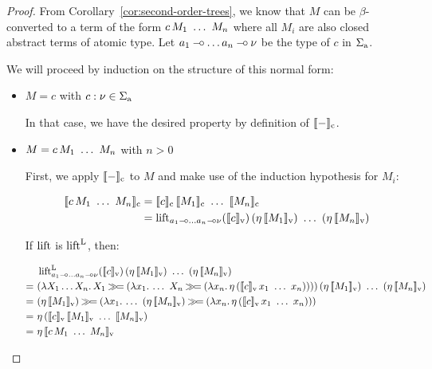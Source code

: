 \begin{proof}
  From Corollary~\ref{cor:second-order-trees}, we know that $M$ can be
  $\beta$-converted to a term of the form $\ap{c}{M_1\ \ldots\ M_n}$ where
  all $M_i$ are also closed abstract terms of atomic type. Let
  $a_1 \mathbin{{-}\mkern-3.5mu{\circ}} \ldots a_n \mathbin{{-}\mkern-3.5mu{\circ}} \nu$ be the type of $c$ in $\Sigma_{\mathrm{a}}$.

  We will proceed by induction on the structure of this normal form:

  \begin{itemize}
  \item $M = c$ with $c : \nu \in \Sigma_{\mathrm{a}}$
    
    In that case, we have the desired property by definition of
    $\llbracket - \rrbracket_{\mathrm{c}}$.
  
  \item $M = c\,M_1\ \ldots\ M_n$ with $n > 0$

    First, we apply $\llbracket - \rrbracket_{\mathrm{c}}$ to $M$ and make use of the induction
    hypothesis for $M_i$:

    \begin{align*}
      \sem{\ap{c}{M_1\ \ldots\ M_n}}_\petitc
      &= \ap{\sem{c}_\petitc}{\sem{M_1}_\petitc\ \ldots\ \sem{M_n}_\petitc} \\
      &= \ap{\lift_{a_1 \limp \ldots a_n \limp \nu}(\sem{c}_\petitv)}
            {(\etaE{\sem{M_1}_\petitv})\ \ldots\ (\etaE{\sem{M_n}_\petitv})}
    \end{align*}
    
    If $\operatorname{lift}$ is $\operatorname{lift}^{\mathrm{L}}$, then:

    \begin{align*}
      &\ap{\liftl_{a_1 \limp \ldots a_n \limp \nu}(\sem{c}_\petitv)}
         {(\etaE{\sem{M_1}_\petitv})\ \ldots\ (\etaE{\sem{M_n}_\petitv})} \\
      =\ &\ap{(\lam{X_1 \ldots X_n}{X_1 \hsbind (\lam{x_1}{\ldots\ 
                                   X_n \hsbind (\lam{x_n}{
                   \etaE{(\ap{\sem{c}_\petitv}{x_1\ \ldots\ x_n})}})})})}
            {(\etaE{\sem{M_1}_\petitv})\ \ldots\ (\etaE{\sem{M_n}_\petitv})} \\
      =\ &(\etaE{\sem{M_1}_\petitv}) \hsbind (\lam{x_1}{\ldots\ 
         (\etaE{\sem{M_n}_\petitv}) \hsbind (\lam{x_n}{
              \etaE{(\ap{\sem{c}_\petitv}{x_1\ \ldots\ x_n})}})}) \\
      =\ &\etaE{(\ap{\sem{c}_\petitv}{\sem{M_1}_\petitv\ \ldots\ \sem{M_n}_\petitv})} \\
      =\ &\etaE{\sem{\ap{c}{M_1\ \ldots\ M_n}}_\petitv} \\
    \end{align*}
    

\end{itemize}
\end{proof}
